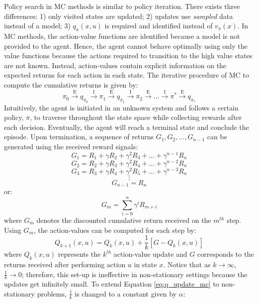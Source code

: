 Policy search in MC methods is similar to policy iteration. There exists three differences: 1) only visited states are updated; 2) updates use \textit{sampled} data instead of a model; 3) $q_{\pi}(x, u)$ is required and identified instead of $v_{\pi}(x)$. In MC methods, the action-value functions are identified because a model is not provided to the agent. Hence, the agent cannot behave optimally using only the value functions because the actions required to transition to the high value states are not known. Instead, action-values contain explicit information on the expected returns for each action in each state.  The iterative procedure of MC to compute the cumulative returns is given by: 
\begin{equation}
    \pi_0 \xrightarrow{\text{E}} 
    q_{\pi_0} \xrightarrow{\text{I}} 
    \pi_1 \xrightarrow{\text{E}}
    q_{\pi_1} \xrightarrow{\text{I}} 
    \pi_2 \xrightarrow{\text{E}} ... \xrightarrow{\text{I}} 
    \pi^* \xrightarrow{\text{E}}  q_{\pi_*}
\end{equation}
Intuitively, the agent is initiated in an unknown system and follows a certain policy, $\pi$, to traverse throughout the state space while collecting rewards after each decision. Eventually, the agent will reach a terminal state and conclude the episode. Upon termination, a sequence of returns $G_1, G_2, ..., G_{n - 1}$ can be generated using the received reward signals:
$$G_1 = R_{1} + \gamma R_{2} + \gamma^2 R_{3} + ... + \gamma^{n - 1}R_{n}$$
$$G_2 = R_{2} + \gamma R_{3} + \gamma^2 R_{4} + ... + \gamma^{n - 2}R_{n}$$
$$G_3 = R_{3} + \gamma R_{4} + \gamma^2 R_{5} + ... + \gamma^{n - 3}R_{n}$$
$$\vdots$$
$$G_{n - 1} = R_n$$
or:
\begin{equation}
    G_m = \sum\limits_{i=0}^n \gamma^{i} R_{m + i}
\end{equation}
where $G_m$ denotes the discounted cumulative return received on the $m^{th}$ step. Using $G_m$, the action-values can be computed for each step by:
\begin{equation}
    Q_{k+1}(x, u) = Q_{k}(x, u) + \frac{1}{k} \left[G - Q_k(x, u) \right]
    \label{eq:q_update_mc}
\end{equation}
where $Q_k(x, u)$ represents the $k^{th}$ action-value update and $G$ corresponds to the returns received after performing action $u$ in state $x$. Notice that as $k \rightarrow \infty$, $\frac{1}{k} \rightarrow 0$; therefore, this set-up is ineffective in non-stationary settings because the updates get infinitely small.  To extend Equation \ref{eq:q_update_mc} to non-stationary problems, $\frac{1}{k}$ is changed to a constant given by $\alpha$:
